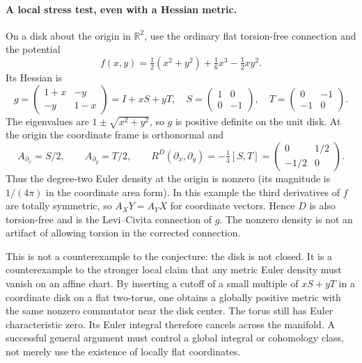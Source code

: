 \documentclass[11pt]{article}
\begin{document}
\paragraph{A local stress test, even with a Hessian metric.}
On a disk about the origin in $\mathbb R^2$, use the ordinary flat
torsion-free connection and the potential
\[
 f(x,y)=\tfrac12(x^2+y^2)+\tfrac16x^3-\tfrac12xy^2.
\]
Its Hessian is
\[
 g=\begin{pmatrix}1+x&-y\\-y&1-x\end{pmatrix}
  =I+xS+yT,\quad
 S=\begin{pmatrix}1&0\\0&-1\end{pmatrix},\quad
 T=\begin{pmatrix}0&-1\\-1&0\end{pmatrix}.
\]
The eigenvalues are $1\pm\sqrt{x^2+y^2}$, so $g$ is positive definite
on the unit disk. At the origin the coordinate frame is orthonormal and
\[
 A_{\partial_x}=S/2,\qquad A_{\partial_y}=T/2,
 \qquad
 R^D(\partial_x,\partial_y)
 =-\tfrac14[S,T]
 =\begin{pmatrix}0&1/2\\-1/2&0\end{pmatrix}.
\]
Thus the degree-two Euler density at the origin is nonzero (its magnitude
is $1/(4\pi)$ in the coordinate area form). In this example the third
derivatives of $f$ are totally symmetric, so
$A_XY=A_YX$ for coordinate vectors. Hence $D$ is also torsion-free and is
the Levi--Civita connection of $g$. The nonzero density is not an artifact
of allowing torsion in the corrected connection.

This is not a counterexample to the conjecture: the disk is not closed.
It is a counterexample to the stronger local claim that any metric Euler
density must vanish on an affine chart. By inserting a cutoff of a small
multiple of $xS+yT$ in a coordinate disk on a flat two-torus, one obtains
a globally positive metric with the same nonzero commutator near the disk
center. The torus still has Euler characteristic zero. Its Euler integral
therefore cancels across the manifold. A successful general argument must
control a global integral or cohomology class, not merely use the existence
of locally flat coordinates.
\end{document}

